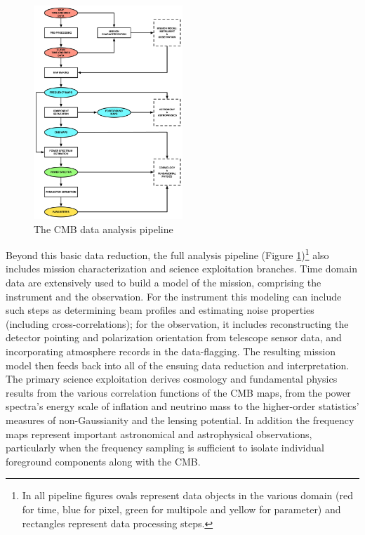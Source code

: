 \begin{figure}[htbp]
\centering
\includegraphics[width=0.5\textwidth]{Analysis/da}
\caption{The CMB data analysis pipeline}
\label{fig_da}
\end{figure}

Beyond this basic data reduction, the full analysis pipeline (Figure \ref{fig_da})\footnote{In all pipeline figures ovals represent data objects in the various domain (red for time, blue for pixel, green for multipole and yellow for parameter) and rectangles represent data processing steps.} also includes mission characterization and science exploitation branches. Time domain data are extensively used to build a model of the mission, comprising the instrument and the observation. For the instrument this modeling can include such steps as determining beam profiles and estimating noise properties (including cross-correlations); for the observation, it includes reconstructing the detector pointing and polarization orientation from telescope sensor data, and incorporating atmosphere records in the data-flagging. The resulting mission model then feeds back into all of the ensuing data reduction and interpretation. The primary science exploitation derives cosmology and fundamental physics results from the various correlation functions of the CMB maps, from the power spectra's energy scale of inflation and neutrino mass to the higher-order statistics'  measures of non-Gaussianity and the lensing potential. In addition the frequency maps represent important astronomical and astrophysical observations, particularly when the frequency sampling is sufficient to isolate individual foreground components along with the CMB. 

